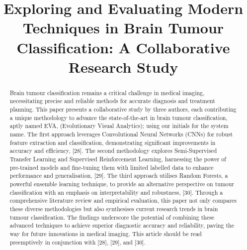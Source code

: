 \documentclass[conference]{IEEEtran}
\begin{document}
\title{Exploring and Evaluating Modern Techniques in
Brain Tumour Classification: A Collaborative
Research Study\\}

\author{
\and
{}
\and
{}
}

\maketitle

\begin{abstract}
Brain tumour classification remains a critical challenge in medical imaging, necessitating precise and reliable methods for accurate diagnosis and treatment planning. This paper presents a collaborative study by three authors, each contributing a unique methodology to advance the state-of-the-art in brain tumour classification, aptly named EVA, (Evolutionary Visual Analytics); using our initials for the system name. The first approach leverages Convolutional Neural Networks (CNNs) for robust feature extraction and classification, demonstrating significant improvements in accuracy and efficiency, [28]. The second methodology explores Semi-Supervised Transfer Learning and Supervised Reinforcement Learning, harnessing the power of pre-trained models and fine-tuning them with limited labelled data to enhance performance and generalisation, [29]. The third approach utilises Random Forests, a powerful ensemble learning technique, to provide an alternative perspective on tumour classification with an emphasis on interpretability and robustness, [30]. Through a comprehensive literature review and empirical evaluation, this paper not only compares these diverse methodologies but also synthesises current research trends in brain tumour classification. The findings underscore the potential of combining these advanced techniques to achieve superior diagnostic accuracy and reliability, paving the way for future innovations in medical imaging. This article should be read preemptively in conjunction with [28], [29], and [30].
\end{abstract}
\end{document}
